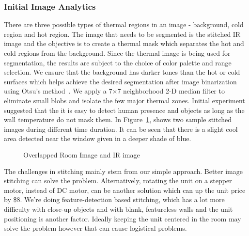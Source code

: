 \subsubsection{\textbf{Initial Image Analytics}}

There are three possible types of thermal regions in an image - background, cold region and hot region. The image that needs to be segmented is the stitched IR image and the objective is to create a thermal mask which separates the hot and cold regions from the background. Since the thermal image is being used for segmentation, the results are subject to the choice of color palette and range selection.  We ensure that the background has darker tones than the hot or cold surfaces which helps achieve the desired segmentation after image binarization using Otsu's method~\cite{OTSU}. We apply a 7$\times$7 neighborhood 2-D median filter to eliminate small blobs and isolate the few major thermal zones. Initial experiment suggested that the it is easy to detect human presence and objects as long as the wall temperature do not mask them. In Figure~\ref{fig:IR}, shows two sample stitched images during different time duration. It can be seen that there is a slight cool area detected near the window given in a deeper shade of blue. 

\begin{figure}[t]
 \centering
       \centering
    \caption{Overlapped Room Image and IR image}
    \label{fig:IR}
\end{figure}

\indent The challenges in stitching mainly stem from our simple approach. Better image stitching can solve the problem. Alternatively, rotating the unit on a stepper motor, instead of DC motor, can be another solution which can up the unit price by \$8. We're doing feature-detection based stitching, which has a lot more difficulty with close-up objects and with blank, featureless walls and the unit positioning is another factor. Ideally keeping the unit centered in the room may solve the problem however that can cause logistical problems.  